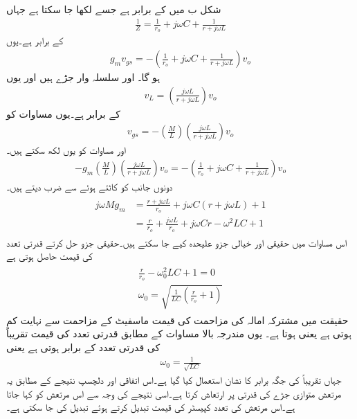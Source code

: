 شکل  ب میں  کے برابر ہے جسے  لکھا جا سکتا ہے جہاں
\begin{align*}
\frac{1}{Z}=\frac{1}{r_o}+j \omega C +\frac{1}{r +j \omega L}
\end{align*}
کے برابر ہے۔یوں
\begin{align} \label{مساوات_امالہ_کپیسٹر_مرتعش_برقی_رو}
g_m v_{gs}=-\left(\frac{1}{r_o}+j \omega C +\frac{1}{r +j \omega L} \right) v_o
\end{align}
 ہو گا۔ اور  سلسلہ وار جڑے ہیں اور یوں
\begin{align}
v_L =\left( \frac{j \omega L}{r+j \omega L} \right) v_o
\end{align}
کے برابر ہے۔یوں مساوات  کو
\begin{align}
v_{gs}=-\left(\frac{M}{L} \right) \left( \frac{j \omega L}{r+j \omega L} \right) v_o
\end{align}
اور مساوات  کو یوں لکھ سکتے ہیں۔
\begin{align*}
-g_m \left(\frac{M}{L} \right) \left( \frac{j \omega L}{r+j \omega L} \right) v_o=-\left(\frac{1}{r_o}+j \omega C +\frac{1}{r +j \omega L} \right) v_o
\end{align*}
دونوں جانب  کو کاٹتے ہوئے  سے ضرب دیتے ہیں۔
\begin{gather}
\begin{aligned} \label{مساوات_امالہ_کپیسٹر_مرتعش_مساوات}
j \omega M g_m &=\frac{r+j \omega L}{r_o}+j \omega C \left(r+j \omega L \right) +1  \\
&=\frac{r}{r_o}+\frac{j \omega L }{r_o}+j \omega C r-\omega^2 LC+1 
\end{aligned}
\end{gather}
اس مساوات میں حقیقی اور خیالی جزو علیحدہ کیے جا سکتے ہیں۔حقیقی جزو حل کرتے قدرتی تعدد  کی قیمت حاصل ہوتی ہے
\begin{gather}
\begin{aligned}
\frac{r}{r_o}-\omega_0^2 LC +1 =0 \\
\omega_0 = \sqrt{\frac{1}{LC} \left(\frac{r}{r_o}+1 \right)}
\end{aligned}
\end{gather}
حقیقت میں مشترکہ امالہ کی مزاحمت  کی قیمت ماسفیٹ کے مزاحمت  سے نہایت کم ہوتی ہے یعنی  ہوتا ہے۔ یوں مندرجہ بالا مساوات کے مطابق قدرتی تعدد کی قیمت تقریباً  کی قدرتی تعدد کے برابر ہوتی ہے یعنی
\begin{align}
\omega_0 = \frac{1}{\sqrt{LC}}
\end{align}
جہاں تقریباً کی جگہ برابر کا نشان استعمال کیا گیا ہے۔اس اتفاقی اور دلچسپ نتیجے کے مطابق یہ مرتعش متوازی جڑے  کی قدرتی  پر ارتعاش کرتا ہے۔اسی نتیجے کی وجہ سے  اس مرتعش کو   کہا جاتا ہے۔اس مرتعش کی تعدد کپیسٹر  کی قیمت تبدیل کرتے ہوئے تبدیل کی جا سکتی ہے۔

